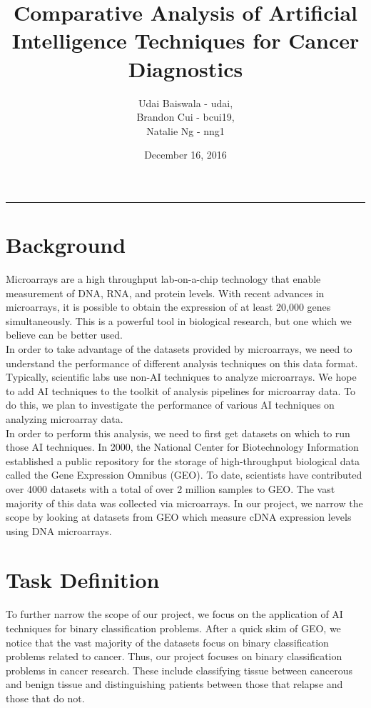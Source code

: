 \documentclass[12pt]{scrartcl}
\title{Comparative Analysis of Artificial Intelligence Techniques for Cancer Diagnostics}
\author{Udai Baiswala - udai, \\ 
Brandon Cui - bcui19, \\ 
Natalie Ng - nng1}
\date{December 16, 2016}
\begin{document}
  \maketitle

  \vspace{-0.3in}
  \rule{\linewidth}{0.4pt}
  
    \section{Background}
    Microarrays are a high throughput lab-on-a-chip technology that enable measurement of DNA, RNA, and protein levels. With recent advances in microarrays, it is possible to obtain the expression of at least 20,000 genes simultaneously. This is a powerful tool in biological research, but one which we believe can be better used. \\
    
    In order to take advantage of the datasets provided by microarrays, we need to understand the performance of different analysis techniques on this data format. Typically, scientific labs use non-AI techniques to analyze microarrays. We hope to add AI techniques to the toolkit of analysis pipelines for microarray data. To do this, we plan to investigate the performance of various AI techniques on analyzing microarray data. \\
    
    In order to perform this analysis, we need to first get datasets on which to run those AI techniques. In 2000, the National Center for Biotechnology Information established a public repository for the storage of high-throughput biological data called the Gene Expression Omnibus (GEO). To date, scientists have contributed over 4000 datasets with a total of over 2 million samples to GEO. The vast majority of this data was collected via microarrays. In our project, we narrow the scope by looking at datasets from GEO which measure cDNA expression levels using DNA microarrays. 

    \section{Task Definition}    
    To further narrow the scope of our project, we focus on the application of AI techniques for binary classification problems. After a quick skim of GEO, we notice that the vast majority of the datasets focus on binary classification problems related to cancer. Thus, our project focuses on binary classification problems in cancer research. These include classifying tissue between cancerous and benign tissue and distinguishing patients between those that relapse and those that do not. 
\end{document}
